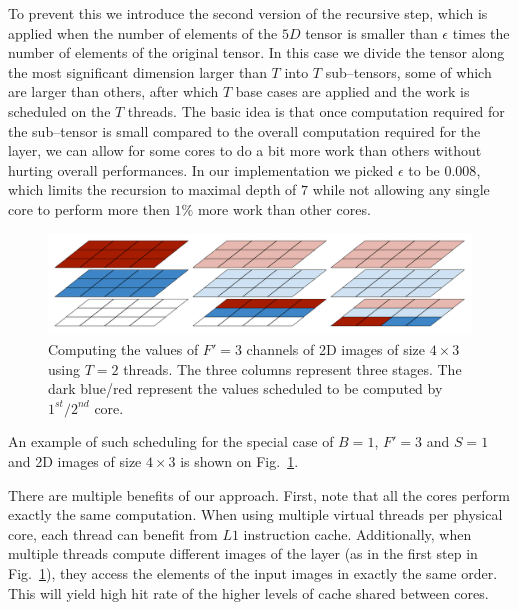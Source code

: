   To prevent this we introduce the second version of the recursive
  step, which is applied when the number of elements of the $5D$
  tensor is smaller than $\epsilon$ times the number of elements of
  the original tensor.  In this case we divide the tensor along the
  most significant dimension larger than $T$ into $T$ sub--tensors,
  some of which are larger than others, after which $T$ base cases are
  applied and the work is scheduled on the $T$ threads.  The basic
  idea is that once computation required for the sub--tensor is small
  compared to the overall computation required for the layer, we can
  allow for some cores to do a bit more work than others without
  hurting overall performances.  In our implementation we picked
  $\epsilon$ to be $0.008$, which limits the recursion to maximal
  depth of $7$ while not allowing any single core to perform more then
  $1\%$ more work than other cores.

  \begin{figure}
    \begin{center}
      \includegraphics[width=0.67\linewidth]{fig/static2}
    \end{center}
    \caption{Computing the values of $F'=3$ channels of 2D images of
      size $4 \times 3$ using $T=2$ threads.  The three columns
      represent three stages.  The dark blue/red represent the values
      scheduled to be computed by $1^{st}/2^{nd}$ core.}
    \label{fig:problem-subdivision}
  \end{figure}

  An example of such scheduling for the special case of $B=1$, $F'=3$
  and $S=1$ and 2D images of size $4 \times 3$ is shown on
  Fig.~\ref{fig:problem-subdivision}.

  There are multiple benefits of our approach.  First, note that all
  the cores perform exactly the same computation.  When using multiple
  virtual threads per physical core, each thread can benefit from $L1$
  instruction cache.  Additionally, when multiple threads compute
  different images of the layer (as in the first step in
  Fig.~\ref{fig:problem-subdivision}), they access the elements of the
  input images in exactly the same order.  This will yield high hit
  rate of the higher levels of cache shared between cores.

